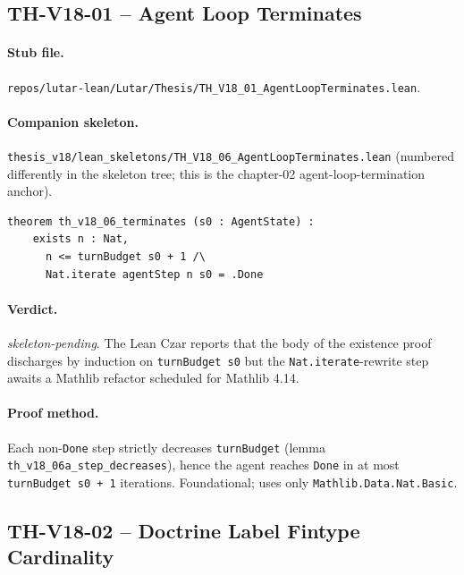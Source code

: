 \subsection{TH-V18-01 -- Agent Loop Terminates}
\label{sub:thv18-01}

\paragraph{Stub file.}
\texttt{repos/lutar-lean/Lutar/Thesis/TH\_V18\_01\_AgentLoopTerminates.lean}.

\paragraph{Companion skeleton.}
\texttt{thesis\_v18/lean\_skeletons/TH\_V18\_06\_AgentLoopTerminates.lean}
(numbered differently in the skeleton tree; this is the chapter-02
agent-loop-termination anchor).

\begin{theorem}
\label{thm:thv18-01}
\begin{verbatim}
theorem th_v18_06_terminates (s0 : AgentState) :
    exists n : Nat,
      n <= turnBudget s0 + 1 /\
      Nat.iterate agentStep n s0 = .Done
\end{verbatim}
\end{theorem}

\paragraph{Verdict.} \emph{skeleton-pending}. The Lean Czar reports
that the body of the existence proof discharges by induction on
\texttt{turnBudget s0} but the \texttt{Nat.iterate}-rewrite step
awaits a Mathlib refactor scheduled for Mathlib 4.14.

\paragraph{Proof method.} Each non-\texttt{Done} step strictly
decreases \texttt{turnBudget} (lemma \texttt{th\_v18\_06a\_step\_decreases}),
hence the agent reaches \texttt{Done} in at most
\texttt{turnBudget s0 + 1} iterations. Foundational; uses only
\texttt{Mathlib.Data.Nat.Basic}.

\subsection{TH-V18-02 -- Doctrine Label Fintype Cardinality}
\label{sub:thv18-02}

